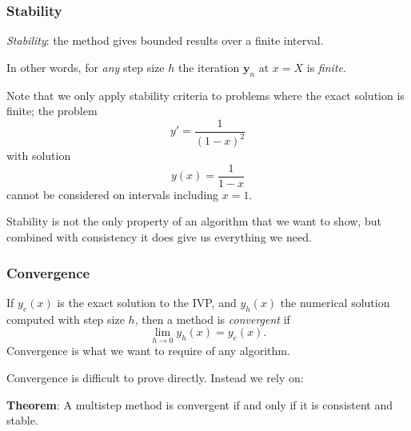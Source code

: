 \documentclass{beamer}
\newcommand{\by}{{\boldsymbol{y}}}
\begin{document}
\begin{frame}
  \frametitle{Stability}

  \emph{Stability}: the method gives bounded results over a
  finite interval. \pause

  \vspace{1ex}

  In other words, for \emph{any} step size $h$ the iteration $\by_n$
  at $x = X$ is \emph{finite}. \pause

  \vspace{1ex}

  Note that we only apply stability criteria to problems where the
  exact solution is finite; the problem
  \begin{equation*}
    y' = \frac{1}{(1-x)^2}
  \end{equation*}
  with solution
  \begin{equation*}
    y(x) = \frac{1}{1-x}
  \end{equation*}
  cannot be considered on intervals including $x = 1$. \pause

  \vspace{1ex}

  Stability is not the only property of an algorithm that we want to
  show, but combined with consistency it does give us everything we
  need.

\end{frame}

\begin{frame}
  \frametitle{Convergence}

  If $y_e(x)$ is the exact solution to the IVP, and $y_h(x)$ the
  numerical solution computed with step size $h$, then a method is
  \emph{convergent} if
  \begin{equation*}
    \lim_{h \rightarrow 0} y_h(x) = y_e(x).
  \end{equation*}
  Convergence is what we want to require of any algorithm. \pause

  \vspace{1ex}

  Convergence is difficult to prove directly. Instead we rely on:

  \vspace{1ex}

  {\bf Theorem}: A multistep method is convergent if and only if it is
  consistent and stable.

\end{frame}
\end{document}
